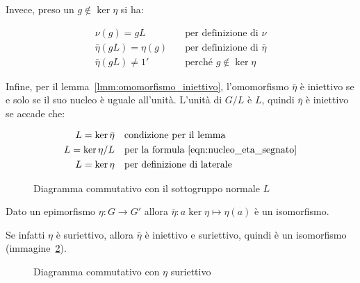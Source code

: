\begin{dimostrazione}
	Invece, preso un $g \not\in \ker \eta$ si ha:
	
	\begin{align}
		\nu(g) = gL &\quad\text{per definizione di $\nu$} \\
		\bar{\eta}(gL) = \eta(g) &\quad\text{per definizione di $\bar{\eta}$} \\
		\bar{\eta}(gL) \ne 1' &\quad\text{perché $g \not\in \ker \eta$}
	\end{align}
	
	Infine, per il lemma~\ref{lmm:omomorfismo_iniettivo}, l'omomorfismo $\bar{\eta}$ è iniettivo se e solo se il suo nucleo è uguale all'unità. L'unità di $G/L$ è $L$, quindi $\bar{\eta}$ è iniettivo se accade che:
	
	\begin{align}
		L = \ker \bar{\eta} & \quad\text{condizione per il lemma} \\
		L = \ker \eta / L & \quad\text{per la formula \eqref{eqn:nucleo_eta_segnato}} \\
		L = \ker \eta & \quad\text{per definizione di laterale}
	\end{align} 
	
\end{dimostrazione}

\begin{figure}[tp]
	\centering
	\caption{Diagramma commutativo con il sottogruppo normale $L$}
	\label{fig:Omomorfismi_fondamentale_con_L}
\end{figure}

\begin{corollario}
	\label{crl:Omomorfismi_fondamentale_1}
	Dato un epimorfismo $\eta: G \longrightarrow G'$ allora $\bar{\eta}: a \ker \eta \longmapsto \eta(a)$ è un isomorfismo.
\end{corollario}
\begin{dimostrazione}
	Se infatti $\eta$ è suriettivo, allora $\bar{\eta}$ è iniettivo e suriettivo, quindi è un isomorfismo (immagine~\ref{fig:eta_suriettivo}).
\end{dimostrazione}

\begin{figure}[tp]
	\centering
	\caption{Diagramma commutativo con $\eta$ suriettivo}
	\label{fig:eta_suriettivo}
\end{figure}


